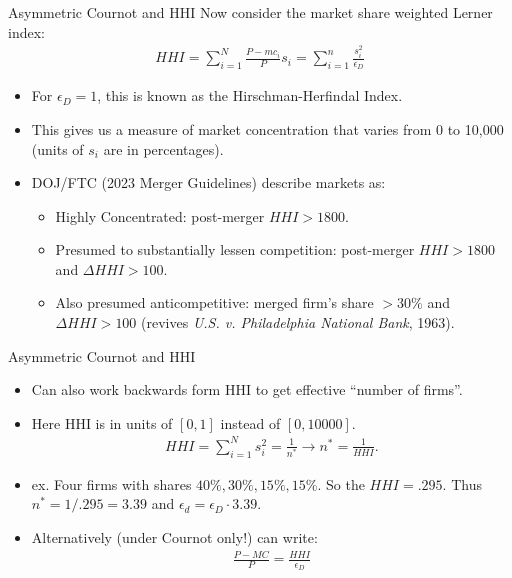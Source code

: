 \documentclass[aspectratio=169,11pt]{beamer}
\begin{document}
\begin{frame}{Asymmetric Cournot and HHI}
Now consider the market share weighted Lerner index:
\begin{eqnarray*}
HHI = \sum_{i=1}^N \frac{P - mc_i}{P} s_i = \sum_{i=1}^n \frac{s_i^2}{\epsilon_D}
\end{eqnarray*}
\begin{itemize}
\item For $\epsilon_D =1$, this is known as the \alert{Hirschman-Herfindal Index}.
\item This gives us a measure of \alert{market concentration} that varies from 0 to 10,000 (units of $s_i$ are in percentages).
\item DOJ/FTC (2023 Merger Guidelines) describe markets as:
\begin{itemize}
\item Highly Concentrated: post-merger $HHI > 1800$.
\item Presumed to substantially lessen competition: post-merger $HHI > 1800$ and $\Delta HHI > 100$.
\item Also presumed anticompetitive: merged firm's share $> 30\%$ and $\Delta HHI > 100$ (revives \textit{U.S. v. Philadelphia National Bank}, 1963).
\end{itemize}
\end{itemize}
\end{frame}

\begin{frame}{Asymmetric Cournot and HHI}
\begin{itemize}
\item Can also work backwards form HHI to get effective ``number of firms''.
\item Here HHI is in units of $[0,1]$ instead of $[0,10000]$.
\begin{eqnarray*}
HHI = \sum_{i=1}^N s_i^2 = \frac{1}{n^*} \rightarrow n^{*} = \frac{1}{HHI}.
\end{eqnarray*}
\item ex. Four firms with shares $40\%, 30\%, 15\%, 15\%$. So the $HHI =.295$. Thus $n^{*} = 1/.295 = 3.39$ and $\epsilon_d = \epsilon_D \cdot 3.39$.
\item Alternatively (under Cournot only!) can write:
\begin{eqnarray*}
\frac{P-MC}{P} = \frac{HHI}{\epsilon_D}
\end{eqnarray*}
\end{itemize}
\end{frame}
\end{document}
